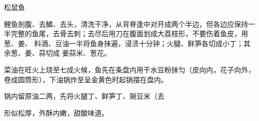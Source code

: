 \begin{recipe}{松鼠鱼}

\ingredients


\preparation

\step 鲤鱼剖腹、去鱗、去头，清洗干净，从背脊逢中对开成两个半边，但各边应保持一
半完整的鱼尾，去骨去刺；去尽后用刀在腹面划成大荔枝形，不要伤着鱼皮，用葱、姜、
料酒、豆油一半将鱼身抹遍，浸渍十分钟；火腿、鲜笋各切成小丁；其余葱、姜、蒜切成
姜蒜米、葱花。

\step 菜油在旺火上烧至七成火候，鱼先在条盘内用干水豆粉抹匀（皮向内，花子向外，
卷成圆筒形），下油锅炸至呈金黄色时起锅摆在盘内。

\step 锅内留原油二两，先将火腿丁、鲜笋丁、豌豆米（去

\features

形似松厚，外酥内嫩，甜酸味道。

\end{recipe}

